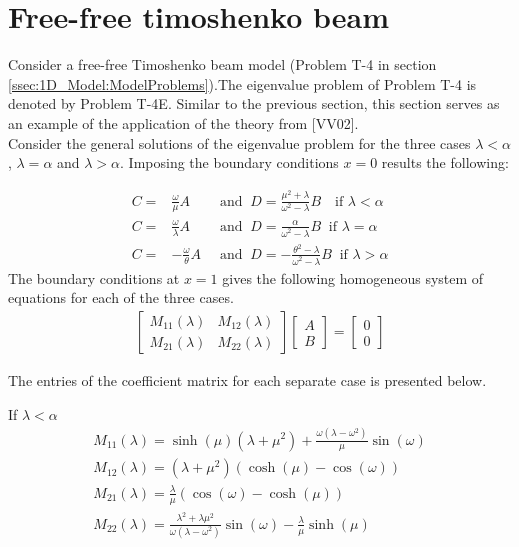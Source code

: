 \documentclass[../../main.tex]{subfiles}
\begin{document}
\section{Free-free timoshenko beam}\label{sec:Timo:Free}
Consider a free-free Timoshenko beam model (Problem T-4 in section \ref{ssec:1D_Model:ModelProblems}).The eigenvalue problem of Problem T-4 is denoted by Problem T-4E. Similar to the previous section, this section serves as an example of the application of the theory from [VV02].\\

Consider the general solutions of the eigenvalue problem for the three cases $\lambda < \alpha$, $\lambda = \alpha$ and $\lambda > \alpha$. Imposing the boundary conditions $x = 0$ results the following:

\begin{align}
	C  =&  \frac{\omega}{\mu}A &\textrm{ and } \ D = \frac{ \mu^2+\lambda}{\omega^2-\lambda}B \ \ \ \textrm{ if } \lambda < \alpha \label{A1}\\
	C = & \frac{\omega}{\lambda}A \ &\textrm{ and } \ D = \frac{\alpha}{\omega^2-\lambda}B  \ \textrm{ if } \lambda = \alpha \label{A2}\\
	C= &-\frac{\omega}{\theta}A \ &\textrm{ and } \ D = -\frac{\theta^2-\lambda}{\omega^2 - \lambda}B  \ \textrm{ if } \lambda > \alpha \label{A3}
\end{align}
The boundary conditions at $x = 1$ gives the following homogeneous system of equations for each of the three cases.
\begin{align}
	\begin{bmatrix}
		M_{11}(\lambda) & M_{12}(\lambda)\\
		M_{21}(\lambda) & M_{22}(\lambda)
	\end{bmatrix}
	\begin{bmatrix}
		A\\
		B
	\end{bmatrix}
	= 
	\begin{bmatrix}
		0\\
		0
	\end{bmatrix}
	\label{eq:Timo:Free:SystemOfEquations}
\end{align}

The entries of the coefficient matrix for each separate case is presented below.

{If $\lambda < \alpha$}
\begin{align*}
	&M_{11}(\lambda) = \sinh(\mu)(\lambda+\mu^2) + \frac{\omega(\lambda - \omega^2)}{\mu}\sin(\omega)&\\
	&M_{12}(\lambda) = (\lambda+\mu^2)(\cosh(\mu)-\cos(\omega))& \\
	&M_{21}(\lambda) = \frac{\lambda}{\mu}(\cos(\omega) - \cosh(\mu))&\\
	&M_{22}(\lambda) =\frac{\lambda^2+\lambda\mu^2}{\omega(\lambda-\omega^2)}\sin(\omega) - \frac{\lambda }{\mu}\sinh(\mu)&
\end{align*}
\end{document}
